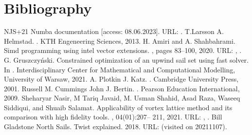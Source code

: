 \documentclass[letterpaper,10pt,english]{jupyterBook}
\begin{document}
\chapter{Bibliography}
\label{\detokenize{chapters/bibliography:bibliography}}\label{\detokenize{chapters/bibliography::doc}}
\begin{sphinxthebibliography}{NJS+21}
\sphinxAtStartPar
Numba documentation {[}access: 08.06.2023{]}. URL: .
\sphinxAtStartPar
T.Larsson A. Helmstad. . KTH Engeneering Sciences, 2013.
\sphinxAtStartPar
H. Amiri and A. Shahbahrami. Simd programming using intel vector extensions. , pages 83–100, 2020. URL: , .
\sphinxAtStartPar
G. Gruszczyński. Constrained optimization of an upwind sail set using fast solver. In . Interdisciplinary Center for Mathematical and Computational Modelling, University of Warsaw, 2021.
\sphinxAtStartPar
A. Plotkin J. Katz. . Cambridge University Press, 2001.
\sphinxAtStartPar
Russell M. Cummings John J. Bertin. . Pearson Education International, 2009.
\sphinxAtStartPar
Sheharyar Nasir, M Tariq Javaid, M. Usman Shahid, Asad Raza, Waseeq Siddiqui, and Shuaib Salamat. Applicability of vortex lattice method and its comparison with high fidelity tools. , 04(01):207– 211, 2021. URL: , .
\sphinxAtStartPar
Bill Gladstone North Sails. Twist explained. 2018. URL:  (visited on 2021\sphinxhyphen{}11\sphinxhyphen{}07).

\end{sphinxthebibliography}
\end{document}

